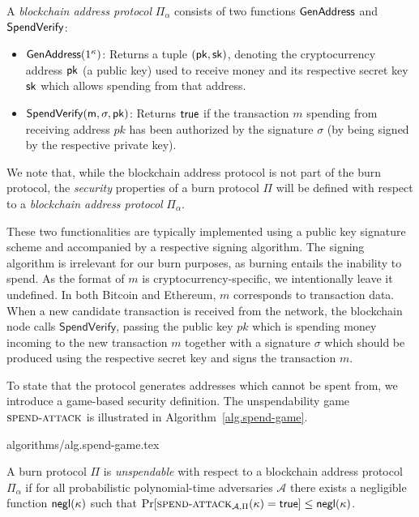 \begin{definition}
  A \emph{blockchain address protocol} $\Pi_\alpha$ consists of two functions $\mathsf{GenAddress}$ and $\sf{SpendVerify}$:

  \begin{itemize}
    \item $\mathsf{GenAddress}(1^\kappa)$: Returns a tuple $(\sf{pk}, \sf{sk})$, denoting the cryptocurrency address $\sf{pk}$ (a public key) used to receive money and its respective secret key $\sf{sk}$ which allows spending from that address.

    \item $\sf{SpendVerify}(m, \sigma, pk)$: Returns $\sf{true}$ if the transaction $m$ spending from receiving address $pk$ has been authorized by the signature $\sigma$ (by being signed by the respective private key).
  \end{itemize}
\end{definition}

We note that, while the blockchain address protocol is not part of the burn protocol, the \emph{security} properties of a burn protocol $\Pi$ will be defined with respect to a \emph{blockchain address protocol} $\Pi_\alpha$.

These two functionalities are typically implemented using a public key signature scheme and accompanied by a respective signing algorithm. The signing algorithm is irrelevant for our burn purposes, as burning entails the inability to spend. As the format of $m$ is cryptocurrency-specific, we intentionally leave it undefined. In both Bitcoin and Ethereum, $m$ corresponds to transaction data. When a new candidate transaction is received from the network, the blockchain node calls $\textsf{SpendVerify}$, passing the public key $pk$ which is spending money incoming to the new transaction $m$ together with a signature $\sigma$ which should be produced using the respective secret key and signs the transaction $m$.

To state that the protocol generates addresses which cannot be spent from, we introduce a game-based security definition. The unspendability game $\textsc{spend}\-\text{-}\-\textsc{attack}$ is illustrated in Algorithm~\ref{alg.spend-game}.

{algorithms/alg.spend-game.tex}

\begin{definition}[Unspendability]
  A burn protocol $\Pi$ is \emph{unspendable} with respect to a blockchain address protocol $\Pi_\alpha$ if
  for all probabilistic polynomial-time adversaries $\mathcal{A}$ there exists a negligible function $\textsf{negl}(\kappa)$ such that
  $
    \Pr[\textsc{spend}\-\text{-}\-\textsc{attack}_{\mathcal{A}, \Pi}(\kappa) = \textsf{true}] \leq \textsf{negl}(\kappa)
  $.
\end{definition}

